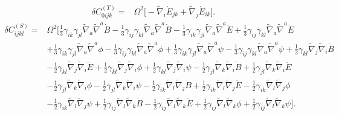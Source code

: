 \documentclass[10pt,letterpaper]{article}
\begin{document}
\begin{align}
\delta C_{0ijk}^{(T)}={}&\Omega^2\bigg[- \tilde{\nabla}_{i}\dot{E}_{jk}
 + \tilde{\nabla}_{j}\dot{E}_{ik}\bigg].
\end{align}
\begin{align}
\delta C_{ijkl}^{(S)}={}&\Omega^2\bigg[\tfrac{1}{3} \gamma_{ik} \gamma_{jl} \tilde{\nabla}_{a}\tilde{\nabla}^{a}\dot{B}
 -  \tfrac{1}{3} \gamma_{ij} \gamma_{kl} \tilde{\nabla}_{a}\tilde{\nabla}^{a}\dot{B}
 -  \tfrac{1}{3} \gamma_{ik} \gamma_{jl} \tilde{\nabla}_{a}\tilde{\nabla}^{a}\ddot{E}
 + \tfrac{1}{3} \gamma_{ij} \gamma_{kl} \tilde{\nabla}_{a}\tilde{\nabla}^{a}\ddot{E}\nonumber\\
& + \tfrac{1}{3} \gamma_{ik} \gamma_{jl} \tilde{\nabla}_{a}\tilde{\nabla}^{a}\phi
 -  \tfrac{1}{3} \gamma_{ij} \gamma_{kl} \tilde{\nabla}_{a}\tilde{\nabla}^{a}\phi
 + \tfrac{1}{3} \gamma_{ik} \gamma_{jl} \tilde{\nabla}_{a}\tilde{\nabla}^{a}\psi
 -  \tfrac{1}{3} \gamma_{ij} \gamma_{kl} \tilde{\nabla}_{a}\tilde{\nabla}^{a}\psi
 + \tfrac{1}{2} \gamma_{kl} \tilde{\nabla}_{j}\tilde{\nabla}_{i}\dot{B}\nonumber\\
& -  \tfrac{1}{2} \gamma_{kl} \tilde{\nabla}_{j}\tilde{\nabla}_{i}\ddot{E}
 + \tfrac{1}{2} \gamma_{kl} \tilde{\nabla}_{j}\tilde{\nabla}_{i}\phi
 + \tfrac{1}{2} \gamma_{kl} \tilde{\nabla}_{j}\tilde{\nabla}_{i}\psi
 -  \tfrac{1}{2} \gamma_{jl} \tilde{\nabla}_{k}\tilde{\nabla}_{i}\dot{B}
 + \tfrac{1}{2} \gamma_{jl} \tilde{\nabla}_{k}\tilde{\nabla}_{i}\ddot{E}\nonumber\\
& -  \tfrac{1}{2} \gamma_{jl} \tilde{\nabla}_{k}\tilde{\nabla}_{i}\phi
 -  \tfrac{1}{2} \gamma_{jl} \tilde{\nabla}_{k}\tilde{\nabla}_{i}\psi
 -  \tfrac{1}{2} \gamma_{ik} \tilde{\nabla}_{l}\tilde{\nabla}_{j}\dot{B}
 + \tfrac{1}{2} \gamma_{ik} \tilde{\nabla}_{l}\tilde{\nabla}_{j}\ddot{E}
 -  \tfrac{1}{2} \gamma_{ik} \tilde{\nabla}_{l}\tilde{\nabla}_{j}\phi\nonumber\\
& -  \tfrac{1}{2} \gamma_{ik} \tilde{\nabla}_{l}\tilde{\nabla}_{j}\psi
 + \tfrac{1}{2} \gamma_{ij} \tilde{\nabla}_{l}\tilde{\nabla}_{k}\dot{B}
 -  \tfrac{1}{2} \gamma_{ij} \tilde{\nabla}_{l}\tilde{\nabla}_{k}\ddot{E}
 + \tfrac{1}{2} \gamma_{ij} \tilde{\nabla}_{l}\tilde{\nabla}_{k}\phi
 + \tfrac{1}{2} \gamma_{ij} \tilde{\nabla}_{l}\tilde{\nabla}_{k}\psi\bigg].
\end{align}
\end{document}
